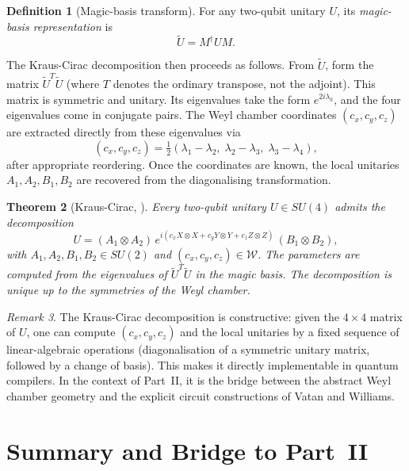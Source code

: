 \documentclass[12pt, a4paper, oneside]{report}
\theoremstyle{plain}
\newtheorem{theorem}{Theorem}[chapter]
\theoremstyle{definition}
\newtheorem{definition}[theorem]{Definition}
\theoremstyle{remark}
\newtheorem{remark}[theorem]{Remark}
\begin{document}
\begin{definition}[Magic-basis transform]
For any two-qubit unitary $U$, its \emph{magic-basis representation} is
\[
  \tilde{U} = M^\dagger U M.
\]
\end{definition}

The Kraus-Cirac decomposition then proceeds as follows. From $\tilde{U}$, form the matrix
$\tilde{U}^T \tilde{U}$ (where $T$ denotes the ordinary transpose, not the adjoint). This
matrix is symmetric and unitary. Its eigenvalues take the form $e^{2i\lambda_k}$, and the
four eigenvalues come in conjugate pairs. The Weyl chamber coordinates $(c_x, c_y, c_z)$
are extracted directly from these eigenvalues via
\[
  (c_x, c_y, c_z)
  = \tfrac{1}{2}(\lambda_1 - \lambda_2,\;\lambda_2 - \lambda_3,\;\lambda_3 - \lambda_4),
\]
after appropriate reordering. Once the coordinates are known, the local unitaries
$A_1, A_2, B_1, B_2$ are recovered from the diagonalising transformation.

\begin{theorem}[Kraus-Cirac, \cite{kraus2001}]
\label{thm:kraus-cirac}
Every two-qubit unitary $U \in SU(4)$ admits the decomposition
\[
  U = (A_1 \otimes A_2)\,e^{i(c_x X\otimes X + c_y Y\otimes Y + c_z Z\otimes Z)}\,(B_1 \otimes B_2),
\]
with $A_1, A_2, B_1, B_2 \in SU(2)$ and $(c_x, c_y, c_z) \in \mathcal{W}$. The parameters
are computed from the eigenvalues of $\tilde{U}^T\tilde{U}$ in the magic basis. The
decomposition is unique up to the symmetries of the Weyl chamber.
\end{theorem}

\begin{remark}
The Kraus-Cirac decomposition is constructive: given the $4 \times 4$ matrix of $U$, one
can compute $(c_x, c_y, c_z)$ and the local unitaries by a fixed sequence of linear-algebraic
operations (diagonalisation of a symmetric unitary matrix, followed by a change of basis).
This makes it directly implementable in quantum compilers. In the context of Part~II, it is
the bridge between the abstract Weyl chamber geometry and the explicit circuit constructions
of Vatan and Williams.
\end{remark}


\section{Summary and Bridge to Part~II}
\end{document}
